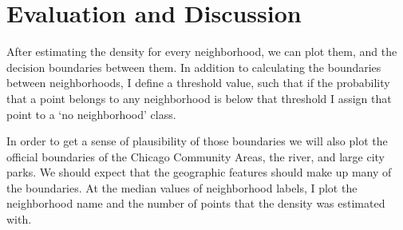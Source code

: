 \documentclass{article}
\begin{document}
\section{Evaluation and Discussion}
After estimating the density for every neighborhood, we can plot them,
and the decision boundaries between them. In addition to calculating
the boundaries between neighborhoods, I define a threshold value, such
that if the probability that a point belongs to any neighborhood is
below that threshold I assign that point to a `no neighborhood' class.

In order to get a sense of plausibility of those boundaries we will
also plot the official boundaries of the Chicago Community Areas, the
river, and large city parks. We should expect that the geographic
features should make up many of the boundaries. At the median values
of neighborhood labels, I plot the neighborhood name and the number of
points that the density was estimated with.
\end{document}
